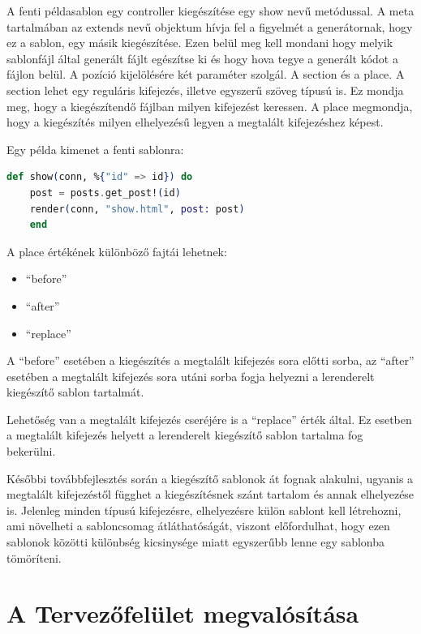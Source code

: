 \documentclass[a4paper,12pt,oneside]{report}
\begin{document}
\begin{justify}
	A fenti példasablon egy controller kiegészítése egy show nevű metódussal. A meta tartalmában az extends nevű objektum hívja fel a figyelmét a generátornak, hogy ez a sablon, egy másik kiegészítése. Ezen belül meg kell mondani hogy melyik sablonfájl által generált fájlt egészítse ki és hogy hova tegye a generált kódot a fájlon belül. A pozíció kijelölésére két paraméter szolgál. A section és a place. A section lehet egy reguláris kifejezés, illetve egyszerű szöveg típusú is. Ez mondja meg, hogy a kiegészítendő fájlban milyen kifejezést keressen. A place megmondja, hogy a kiegészítés milyen elhelyezésű legyen a megtalált kifejezéshez képest.

	Egy példa kimenet a fenti sablonra: 

	\begin{lstlisting}[language=elixir]
	def show(conn, %{"id" => id}) do
	post = posts.get_post!(id)
	render(conn, "show.html", post: post)
	end
	\end{lstlisting}

	A place értékének különböző fajtái lehetnek: 

	\begin{itemize}
		\item “before”
		\item “after”
		\item “replace”
	\end{itemize}

	A “before” esetében a kiegészítés a megtalált kifejezés sora előtti sorba, az “after” esetében a megtalált kifejezés sora utáni sorba fogja helyezni a lerenderelt kiegészítő sablon tartalmát.

	Lehetőség van a megtalált kifejezés cseréjére is a “replace” érték által. Ez esetben a megtalált kifejezés helyett a lerenderelt kiegészítő sablon tartalma fog bekerülni.

	Későbbi továbbfejlesztés során a kiegészítő sablonok át fognak alakulni, ugyanis a megtalált kifejezéstől függhet a kiegészítésnek szánt tartalom és annak elhelyezése is. Jelenleg minden típusú kifejezésre, elhelyezésre külön sablont kell létrehozni, ami növelheti a sabloncsomag átláthatóságát, viszont előfordulhat, hogy ezen sablonok közötti különbség kicsinysége miatt egyszerűbb lenne egy sablonba tömöríteni.

\end{justify}

\newpage
\section{A Tervezőfelület megvalósítása}
\end{document}
